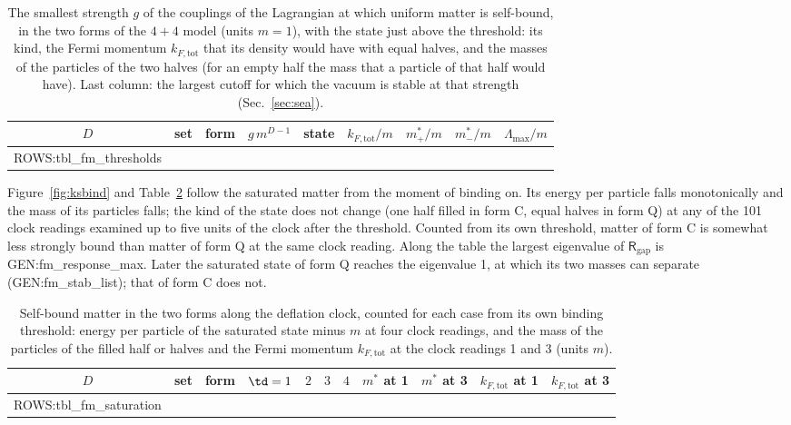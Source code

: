 \begin{table}
\caption{\label{tab:ksthr}The smallest strength $g$ of the couplings of the Lagrangian at which
uniform matter is self-bound, in the two forms of the $4+4$ model (units $m=1$), with the state just
above the threshold: its kind, the Fermi momentum $k_{F,\mathrm{tot}}$ that its density would have with
equal halves, and the masses of the particles of the two halves (for an empty half the mass that a
particle of that half would have). Last column: the largest cutoff for which the vacuum is stable at
that strength (Sec.~\ref{sec:sea}).}
\begin{ruledtabular}
\begin{tabular}{ccccccccc}
$D$ & set & form & $g\,m^{D-1}$ & state & $k_{F,\mathrm{tot}}/m$ & $m^{*}_+/m$ & $m^{*}_-/m$ & $\Lambda_{\max}/m$ \\
\hline
{{ROWS:tbl_fm_thresholds}}
\end{tabular}
\end{ruledtabular}
\end{table}

Figure~\ref{fig:ksbind} and Table~\ref{tab:kssat} follow the saturated matter from the moment of
binding on. Its energy per particle falls monotonically and the mass of its particles falls; the
kind of the state does not change (one half filled in form C, equal halves in form Q) at any of the
101 clock readings examined up to five units of the clock after the threshold. Counted from its own
threshold, matter of form C is somewhat less strongly bound than matter of form Q at the same clock
reading. Along the table the largest eigenvalue of $\mathsf R_{\mathrm{gap}}$ is
{{GEN:fm_response_max}}. Later the saturated state of form Q reaches the eigenvalue 1, at which its
two masses can separate ({{GEN:fm_stab_list}}); that of form C does not.

\begin{table}
\caption{\label{tab:kssat}Self-bound matter in the two forms along the deflation clock, counted for
each case from its own binding threshold: energy per particle of the saturated state minus $m$ at
four clock readings, and the mass of the particles of the filled half or halves and the Fermi
momentum $k_{F,\mathrm{tot}}$ at the clock readings 1 and 3 (units $m$).}
\begin{ruledtabular}
\begin{tabular}{ccccccccccc}
$D$ & set & form & $\td=1$ & $2$ & $3$ & $4$ & $m^{*}$ at 1 & $m^{*}$ at 3 & $k_{F,\mathrm{tot}}$ at 1 & $k_{F,\mathrm{tot}}$ at 3 \\
\hline
{{ROWS:tbl_fm_saturation}}
\end{tabular}
\end{ruledtabular}
\end{table}

